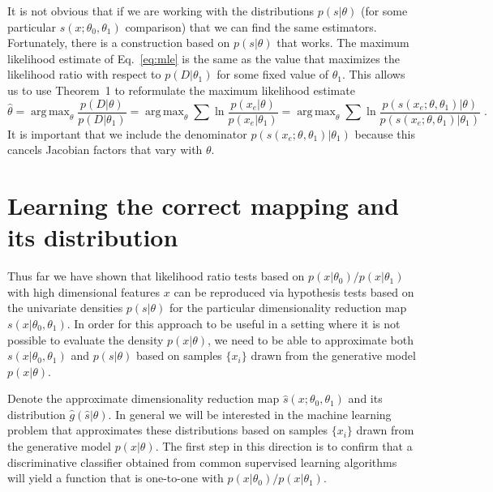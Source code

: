 \documentclass[11pt, oneside]{article}   	%
\DeclareMathOperator*{\argmax}{arg\,max}
\begin{document}
It is not obvious that if we are working with the distributions $p(s|\theta)$ (for some particular $s(x; \theta_0, \theta_1)$ comparison) that we can find the same estimators. 
Fortunately, there is a construction based on $p(s|\theta)$ that works. The maximum likelihood estimate of Eq.~\ref{eq:mle} is the same as the value that maximizes the likelihood ratio with respect to $p(D|\theta_1)$ for some fixed value of $\theta_1$. This allows us to use Theorem~1 to reformulate the maximum likelihood estimate
\begin{equation}
\hat{\theta} = \argmax_\theta \frac{ p(D | \theta)}{ p(D | \theta_1)} = \argmax_\theta  \sum \ln \frac{p(x_e | \theta)}{p(x_e|\theta_1)} = \argmax_\theta  \sum \ln \frac{p(s(x_e; \theta, \theta_1) | \theta)}{p(s(x_e; \theta, \theta_1) |\theta_1)} \; .
\end{equation}
It is important that we include the denominator $p(s(x_e; \theta, \theta_1) |\theta_1)$ because this cancels Jacobian factors that vary with $\theta$.

\section{Learning the correct mapping and its distribution}\label{S:classifier}

Thus far we have shown that likelihood ratio tests based on $p(x|\theta_0)/p(x|\theta_1)$ with high dimensional features $x$ can be reproduced via hypothesis tests based on the univariate densities $p(s|\theta)$ for the particular dimensionality reduction map $s(x|\theta_0, \theta_1)$.
In order for this approach to be useful in a setting where it is not possible to evaluate the density $p(x|\theta)$, we need to be able to approximate both $s(x|\theta_0, \theta_1)$ and $p(s|\theta)$ based on samples $\{x_i\}$ drawn from the generative model $p(x|\theta)$.  

Denote the approximate dimensionality reduction map $\hat{s}(x; \theta_0, \theta_1)$ and its distribution $\hat{g}(\hat{s}|\theta)$. In general we will be interested in the machine learning problem that approximates these distributions based on samples $\{x_i\}$ drawn from the generative model $p(x|\theta)$.  
The first step in this direction is to confirm that a discriminative classifier obtained from common supervised learning algorithms will yield a function that is one-to-one with $p(x|\theta_0)/p(x|\theta_1)$.
\end{document}
